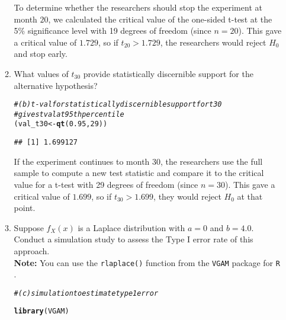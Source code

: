 \documentclass{article}\usepackage[]{graphicx}\usepackage[]{xcolor}
\makeatletter
\newcommand{\hlnum}[1]{\textcolor[rgb]{0.686,0.059,0.569}{#1}}%
\newcommand{\hlcom}[1]{\textcolor[rgb]{0.678,0.584,0.686}{\textit{#1}}}%
\newcommand{\hldef}[1]{\textcolor[rgb]{0.345,0.345,0.345}{#1}}%
\newcommand{\hlkwb}[1]{\textcolor[rgb]{0.69,0.353,0.396}{#1}}%
\newcommand{\hlkwd}[1]{\textcolor[rgb]{0.737,0.353,0.396}{\textbf{#1}}}%
\newenvironment{kframe}{%
 \def\at@end@of@kframe{}%
 \ifinner\ifhmode%
  \def\at@end@of@kframe{\end{minipage}}%
  \begin{minipage}{\columnwidth}%
 \fi\fi%
 \def\FrameCommand##1{\hskip\@totalleftmargin \hskip-\fboxsep
 \colorbox{shadecolor}{##1}\hskip-\fboxsep
     \hskip-\linewidth \hskip-\@totalleftmargin \hskip\columnwidth}%
 \MakeFramed {\advance\hsize-\width
   \@totalleftmargin\z@ \linewidth\hsize
   \@setminipage}}%
 {\par\unskip\endMakeFramed%
 \at@end@of@kframe}
\newenvironment{knitrout}{}{} %
\makeatother
\begin{document}
\begin{enumerate}
\begin{enumerate}
To determine whether the researchers should stop the experiment at month $20$,
we calculated the critical value of the one-sided t-test at the 5\% significance
level with 19 degrees of freedom (since $n=20$). This gave a critical value of
$1.729$, so if $t_{20} > 1.729$, the researchers would reject $H_{0}$ and stop early.
  
  \item What values of $t_{30}$ provide statistically discernible support for the
  alternative hypothesis?
  
\begin{knitrout}\scriptsize
{}\color{fgcolor}\begin{kframe}
\begin{alltt}
  \hlcom{# (b) t-val for statistically discernible support for t30}
  \hlcom{# gives t val at 95th percentile }
  \hldef{(val_t30} \hlkwb{<-} \hlkwd{qt}\hldef{(}\hlnum{0.95}\hldef{,} \hlnum{29}\hldef{))}
\end{alltt}
\begin{verbatim}
## [1] 1.699127
\end{verbatim}
\end{kframe}
\end{knitrout}
  
If the experiment continues to month 30, the researchers use the full sample to compute a new test statistic and compare it to the critical value for a t-test with 29 degrees of freedom (since $n=30$). This gave a critical value of $1.699$,
so if $t_{30} > 1.699$, they would reject $H_{0}$ at that point.


  \item Suppose $f_X(x)$ is a Laplace distribution with $a=0$ and $b=4.0$.
  Conduct a simulation study to assess the Type I error rate of this approach.\\
  \textbf{Note:} You can use the \texttt{rlaplace()} function from the \texttt{VGAM}
  package for \texttt{R} \citep{VGAM}.
  
\begin{knitrout}\scriptsize
{}\color{fgcolor}\begin{kframe}
\begin{alltt}
\hlcom{# (c) simulation to estimate type 1 error}

\hlkwd{library}\hldef{(VGAM)}
\end{alltt}


{\ttfamily\noindent\itshape\color{messagecolor}{\#\# Loading required package: stats4}}


\end{kframe}
\end{knitrout}
\end{enumerate}
\end{enumerate}
\end{document}
